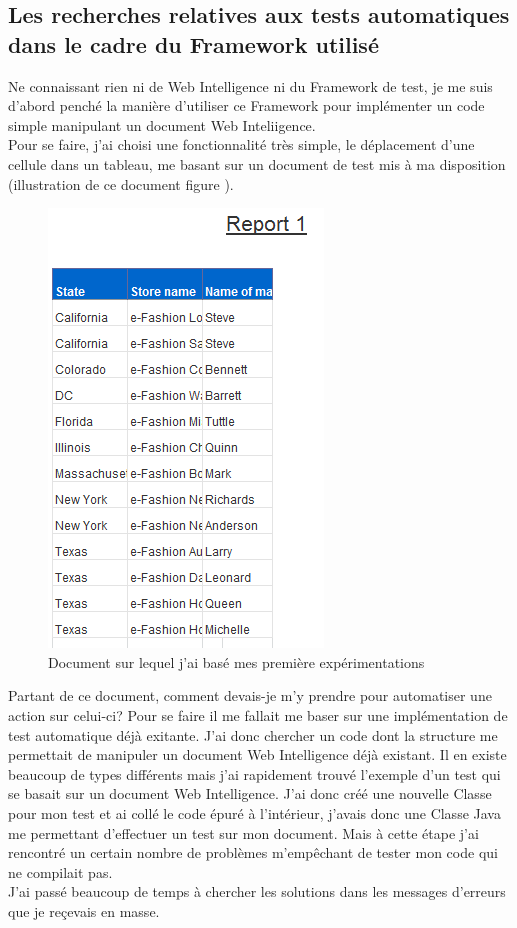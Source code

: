 \subsection{Les recherches relatives aux tests automatiques dans le cadre du Framework utilis\'{e}}


Ne connaissant rien ni de Web Intelligence ni du Framework de test, je me suis d'abord pench\'{e} la mani\`{e}re d'utiliser ce Framework pour impl\'{e}menter un code simple manipulant un document Web Inteliigence.\\

Pour se faire, j'ai choisi une fonctionnalit\'{e} tr\`{e}s simple, le d\'{e}placement d'une cellule dans un tableau, me basant sur un document de test mis \`{a} ma disposition (illustration de ce document figure \pageref{figure:docsample}).\\

\begin{figure}[!h]
  \centering
      \includegraphics{images/docsample.png}
  \caption{Document sur lequel j'ai bas\'{e} mes premi\`{e}re exp\'{e}rimentations}
	\label{figure:docsample}
\end{figure}
 
Partant de ce document, comment devais-je m'y prendre pour automatiser une action sur celui-ci? Pour se faire il me fallait me baser sur une impl\'{e}mentation de test automatique d\'{e}j\`{a} exitante. J'ai donc chercher un code dont la structure me permettait de manipuler un document Web Intelligence d\'{e}j\`{a} existant. Il en existe beaucoup de types diff\'{e}rents mais j'ai rapidement trouv\'{e} l'exemple d'un test qui se basait sur un document Web Intelligence. J'ai donc cr\'{e}\'{e} une nouvelle \gls{Classe} pour mon test et ai coll\'{e} le code \'{e}pur\'{e} \`{a} l'int\'{e}rieur, j'avais donc une \gls{Classe} Java me permettant d'effectuer un test sur mon document. Mais \`{a} cette \'{e}tape j'ai rencontr\'{e} un certain nombre de probl\`{e}mes m'emp\^{e}chant de tester mon code qui ne compilait pas.\\
J'ai pass\'{e} beaucoup de temps \`{a} chercher les solutions dans les messages d'erreurs que je re\c{c}evais en masse.\\

